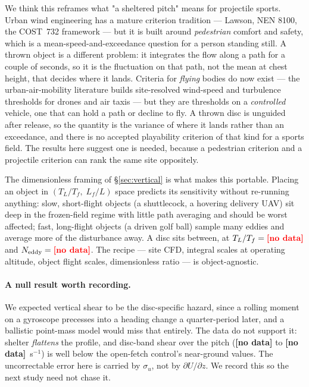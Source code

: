 \documentclass[11pt,letterpaper]{article}
\newcommand{\MISSINGNUM}{\textbf{\color{red}[no data]}}%
\newcommand{\VertNeddyRange}{\MISSINGNUM}%
\newcommand{\VertShearBandHNineZero}{\MISSINGNUM}\newcommand{\VertShearBandHTwoOneZero}{\MISSINGNUM}%
\begin{document}
We think this reframes what "a sheltered pitch" means for projectile sports.
Urban wind engineering has a mature criterion tradition --- Lawson, NEN 8100,
the COST~732 framework --- but it is built around \emph{pedestrian} comfort and
safety, which is a mean-speed-and-exceedance question for a person standing
still. A thrown object is a different problem: it integrates the flow along a
path for a couple of seconds, so it is the fluctuation on that path, not the
mean at chest height, that decides where it lands. Criteria for \emph{flying}
bodies do now exist --- the urban-air-mobility literature builds site-resolved
wind-speed and turbulence thresholds for drones and air taxis --- but they are
thresholds on a \emph{controlled} vehicle, one that can hold a path or decline to
fly. A thrown disc is unguided after release, so the quantity is the variance of
where it lands rather than an exceedance, and there is no accepted playability
criterion of that kind for a sports field. The results here suggest one is needed,
because a pedestrian criterion and a projectile criterion can rank the same site
oppositely.

The dimensionless framing of \S\ref{sec:vertical} is what makes this portable.
Placing an object in $(T_L/T_f,\; L_f/L)$ space predicts its sensitivity without
re-running anything: slow, short-flight objects (a shuttlecock, a hovering
delivery UAV) sit deep in the frozen-field regime with little path averaging and
should be worst affected; fast, long-flight objects (a driven golf ball) sample
many eddies and average more of the disturbance away. A disc sits between, at
$T_L/T_f = \VertTLratioRange{}$ and $N_{\text{eddy}} = \VertNeddyRange{}$. The
recipe --- site CFD, integral scales at operating altitude, object flight
scales, dimensionless ratio --- is object-agnostic.

\paragraph{A null result worth recording.} We expected vertical shear to be the
disc-specific hazard, since a rolling moment on a gyroscope precesses into a
heading change a quarter-period later, and a ballistic point-mass model would
miss that entirely. The data do not support it: shelter \emph{flattens} the
profile, and disc-band shear over the pitch (\VertShearBandHNineZero{} to
\VertShearBandHTwoOneZero{}~s$^{-1}$) is well below the open-fetch control's
near-ground values. The uncorrectable error here is carried by $\sigma_u$, not
by $\partial U/\partial z$. We record this so the next study need not chase it.
\end{document}
